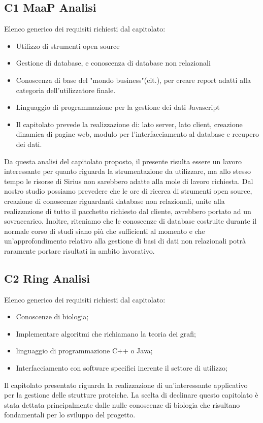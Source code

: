 \subsection{C1 MaaP Analisi}
Elenco generico dei requisiti richiesti dal capitolato:
\begin{itemize} 
\item Utilizzo di strumenti open source
\item Gestione di database, e conoscenza di database non relazionali
\item Conoscenza di base del "mondo business"(cit.), per creare report adatti alla categoria dell'utilizzatore finale.
\item Linguaggio di programmazione per la gestione dei dati Javascript
\item Il capitolato prevede la realizzazione di: lato server, lato client, creazione dinamica di pagine web, modulo per l'interfacciamento al database e recupero dei dati.
\end{itemize}
Da questa analisi del capitolato proposto, il presente risulta essere un lavoro interessante per quanto riguarda la strumentazione da utilizzare, ma allo stesso tempo le risorse di Sirius non sarebbero adatte alla mole di lavoro richiesta. Dal nostro studio possiamo prevedere che le ore di ricerca di strumenti open source, creazione di conoscenze riguardanti database non relazionali, unite alla realizzazione di tutto il pacchetto richiesto dal cliente, avrebbero portato ad un sovraccarico.
Inoltre, riteniamo che le conoscenze di database costruite durante il normale corso di studi siano più che sufficienti al momento e che un'approfondimento relativo alla gestione di basi di dati non relazionali potrà raramente portare risultati in ambito lavorativo.
\\
\subsection{C2 Ring Analisi}
Elenco generico dei requisiti richiesti dal capitolato:
\begin{itemize} 
\item Conoscenze di biologia;
\item Implementare algoritmi che richiamano la teoria dei grafi;
\item linguaggio di programmazione C++ o Java;
\item Interfacciamento con software specifici inerente il settore di utilizzo;
\end{itemize}
Il capitolato presentato riguarda la realizzazione di un'interessante applicativo per la gestione delle strutture proteiche. La scelta di declinare questo capitolato è stata dettata principalmente dalle nulle conoscenze di biologia che risultano fondamentali per lo sviluppo del progetto.\\
